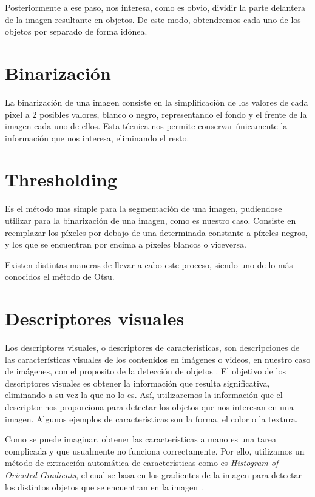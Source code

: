 Posteriormente a ese paso, nos interesa, como es obvio, dividir la parte delantera de la imagen resultante en objetos. De este modo, obtendremos cada uno de los objetos por separado de forma idónea.

\section{Binarización}

La binarización de una imagen consiste en la simplificación de los valores de cada pixel a 2 posibles valores, blanco o negro, representando el fondo y el frente de la imagen cada uno de ellos. Esta técnica nos permite conservar únicamente la información que nos interesa, eliminando el resto.

\section{Thresholding}

Es el método mas simple para la segmentación de una imagen, pudiendose utilizar para la binarización de una imagen, como es nuestro caso. Consiste en reemplazar los píxeles por debajo de una determinada constante a píxeles negros, y los que se encuentran por encima a píxeles blancos o viceversa.

Existen distintas maneras de llevar a cabo este proceso, siendo uno de lo más conocidos el método de Otsu. \cite{wiki:otsu}

\section{Descriptores visuales}

Los descriptores visuales, o descriptores de características, son descripciones de las características visuales de los contenidos en imágenes o videos, en nuestro caso de imágenes, con el proposito de la detección de objetos \cite{wiki:visualdescriptor}. El objetivo de los descriptores visuales es obtener la información que resulta significativa, eliminando a su vez la que no lo es. Así, utilizaremos la información que el descriptor nos proporciona para detectar los objetos que nos interesan en una imagen. Algunos ejemplos de características son la forma, el color o la textura.

Como se puede imaginar, obtener las características a mano es una tarea complicada y que usualmente no funciona correctamente. Por ello, utilizamos un método de extracción automática de características como es \textit{Histogram of Oriented Gradients}, el cual se basa en los gradientes de la imagen para detectar los distintos objetos que se encuentran en la imagen \cite{wiki:hog}.

